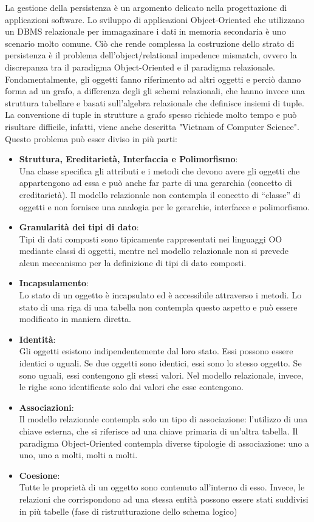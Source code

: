 La gestione della persistenza \`e un argomento delicato nella progettazione di applicazioni software.
Lo sviluppo di applicazioni Object-Oriented che utilizzano un DBMS relazionale per immagazinare i dati in memoria secondaria \`e uno scenario molto comune. Ci\`o che rende complessa la costruzione dello strato di persistenza \`e il problema dell'object/relational impedence mismatch, ovvero la discrepanza tra il paradigma Object-Oriented e il paradigma relazionale.\\
Fondamentalmente, gli oggetti fanno riferimento ad altri oggetti e perci\`o danno forma ad un grafo, a differenza degli gli schemi relazionali, che hanno invece una struttura tabellare e basati sull'algebra relazionale che definisce insiemi di tuple. La conversione di tuple in strutture a grafo spesso richiede molto tempo e pu\`o risultare difficile, infatti, viene anche descritta "Vietnam of Computer Science".
Questo problema pu\`o esser diviso in pi\`u parti:
\begin{itemize}
\item \textbf{Struttura, Ereditariet\`a, Interfaccia e Polimorfismo}:\\
Una classe specifica gli attributi e i metodi che devono avere gli oggetti che appartengono ad essa e pu\`o anche far parte di una gerarchia (concetto di ereditariet\`a).
Il modello relazionale non contempla il concetto di “classe” di oggetti e non fornisce una analogia per le gerarchie, interfacce e polimorfismo.  
\item \textbf{Granularit\`a dei tipi di dato}:\\
Tipi di dati composti sono tipicamente  rappresentati nei linguaggi OO mediante classi di oggetti, mentre nel modello relazionale non si prevede alcun meccanismo per la definizione di tipi di dato composti. 
\item \textbf{Incapsulamento}:\\
Lo stato di un oggetto \`e incapsulato ed \`e accessibile attraverso i metodi. Lo stato di una riga di una tabella non contempla questo aspetto e pu\`o essere modificato in maniera diretta.
\item \textbf{Identit\`a}:\\
Gli oggetti esistono indipendentemente dal loro stato. Essi possono essere identici o uguali. Se due oggetti sono identici, essi sono lo stesso oggetto. Se sono uguali, essi contengono gli stessi valori. Nel modello relazionale, invece, le righe sono identificate solo dai valori che esse contengono.
\item \textbf{Associazioni}:\\
Il modello relazionale contempla solo un tipo di associazione: l'utilizzo di una chiave esterna, che si riferisce ad una chiave primaria di un'altra tabella. Il paradigma Object-Oriented contempla diverse tipologie di associazione: uno a uno, uno a molti, molti a molti.
\item \textbf{Coesione}:\\
Tutte le propriet\`a di un oggetto sono contenuto all'interno di esso. Invece, le relazioni che corrispondono ad una stessa entit\`a possono essere stati suddivisi in pi\`u tabelle (fase di ristrutturazione dello schema logico)
\end{itemize}

